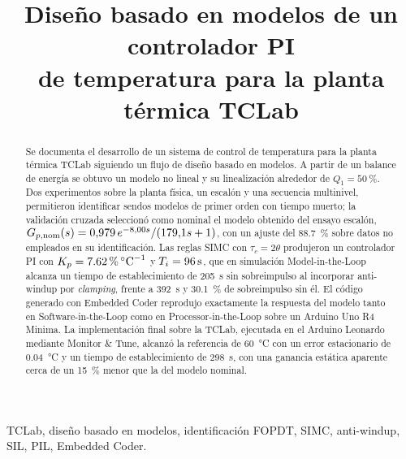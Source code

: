 \documentclass[conference,a4paper,10pt]{IEEEtran}
\begin{document}
\title{Diseño basado en modelos de un controlador PI\\
de temperatura para la planta térmica TCLab}

\author{%
}

\maketitle

\begin{abstract}
Se documenta el desarrollo de un sistema de control de temperatura para la planta térmica TCLab
siguiendo un flujo de diseño basado en modelos. A partir de un balance de energía se obtuvo un
modelo no lineal y su linealización alrededor de $Q_1 = \SI{50}{\percent}$. Dos experimentos sobre
la planta física, un escalón y una secuencia multinivel, permitieron identificar sendos modelos de
primer orden con tiempo muerto; la validación cruzada seleccionó como nominal el modelo obtenido
del ensayo escalón, $G_{p,\mathrm{nom}}(s) = 0{,}979\,e^{-8{,}00 s}/(179{,}1 s + 1)$, con un ajuste del
\SI{88.7}{\percent} sobre datos no empleados en su identificación. Las reglas SIMC con
$\tau_c = 2\theta$ produjeron un controlador PI con $K_p = \SI{7.62}{\percent\per\celsius}$ y
$T_i = \SI{96}{\second}$, que en simulación Model-in-the-Loop alcanza un tiempo de establecimiento
de \SI{205}{\second} sin sobreimpulso al incorporar anti-windup por \emph{clamping}, frente a
\SI{392}{\second} y \SI{30.1}{\percent} de sobreimpulso sin él. El código generado con Embedded
Coder reprodujo exactamente la respuesta del modelo tanto en Software-in-the-Loop como en
Processor-in-the-Loop sobre un Arduino Uno R4 Minima. La implementación final sobre la TCLab,
ejecutada en el Arduino Leonardo mediante Monitor \& Tune, alcanzó la referencia de
\SI{60}{\celsius} con un error estacionario de \SI{0.04}{\celsius} y un tiempo de establecimiento
de \SI{298}{\second}, con una ganancia estática aparente cerca de un \SI{15}{\percent} menor que la
del modelo nominal.
\end{abstract}

\begin{IEEEkeywords}
TCLab, diseño basado en modelos, identificación FOPDT, SIMC, anti-windup, SIL, PIL, Embedded Coder.
\end{IEEEkeywords}










\balance


\end{document}
